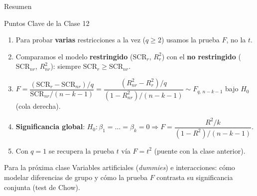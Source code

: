\documentclass{beamer}
\begin{document}
\begin{frame}{Resumen}

\begin{block}{Puntos Clave de la Clase 12}
\begin{enumerate}
    \item Para probar \textbf{varias} restricciones a la vez ($q\geq 2$) usamos la prueba $F$, no la $t$.
    \item Comparamos el modelo \textbf{restringido} ($\text{SCR}_r$, $R^2_r$) con el \textbf{no restringido} ($\text{SCR}_{nr}$, $R^2_{nr}$): siempre $\text{SCR}_r\geq\text{SCR}_{nr}$.
    \item $F=\dfrac{(\text{SCR}_r-\text{SCR}_{nr})/q}{\text{SCR}_{nr}/(n-k-1)} = \dfrac{(R^2_{nr}-R^2_r)/q}{(1-R^2_{nr})/(n-k-1)} \sim F_{q,\,n-k-1}$ bajo $H_0$ (cola derecha).
    \item \textbf{Significancia global}: $H_0:\beta_1=\dots=\beta_k=0 \Rightarrow F=\dfrac{R^2/k}{(1-R^2)/(n-k-1)}$.
    \item Con $q=1$ se recupera la prueba $t$ vía $F=t^2$ (puente con la clase anterior).
\end{enumerate}
\end{block}

\begin{alertblock}{Para la próxima clase}
Variables artificiales (\emph{dummies}) e interacciones: cómo modelar diferencias de grupo y cómo la prueba $F$ contrasta su significancia conjunta (test de Chow).
\end{alertblock}

\end{frame}
\end{document}
